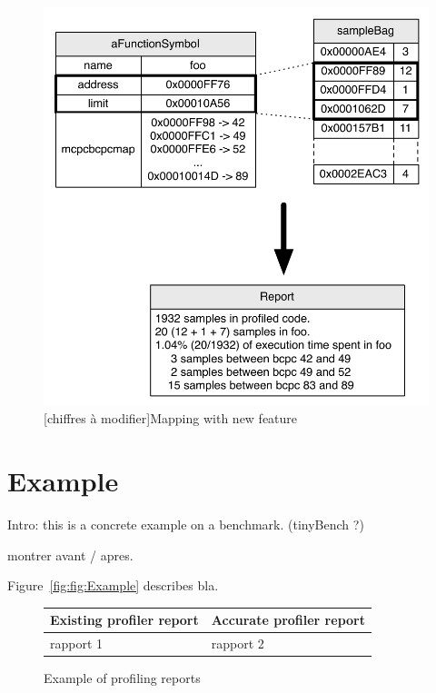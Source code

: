 \documentclass[10pt,preprint,nonatbib]{sigplanconf}
\newcommand{\figref}[1]{Figure~\ref{fig:#1}}
\begin{document}
 \begin{figure}[!htp]
     \begin{center}
         \includegraphics[width=1.0\linewidth]{NewMapping}
         \caption{[chiffres à modifier]Mapping with new feature}
         \label{fig:NewMapping}
     \end{center}
 \end{figure}
 

\section{Example}

Intro: this is a concrete example on a benchmark. (tinyBench ?)

montrer avant / apres.



\figref{fig:Example} describes bla.

\begin{figure}
    \begin{center}
		\noindent \begin{tabular}{l | l}
		Existing profiler report & Accurate profiler report \\		
		\midrule
		rapport 1 & rapport 2 \\	
		\end{tabular}
	\caption{Example of profiling reports}
    \label{fig:Example}
    \end{center}
\end{figure}
\end{document}

